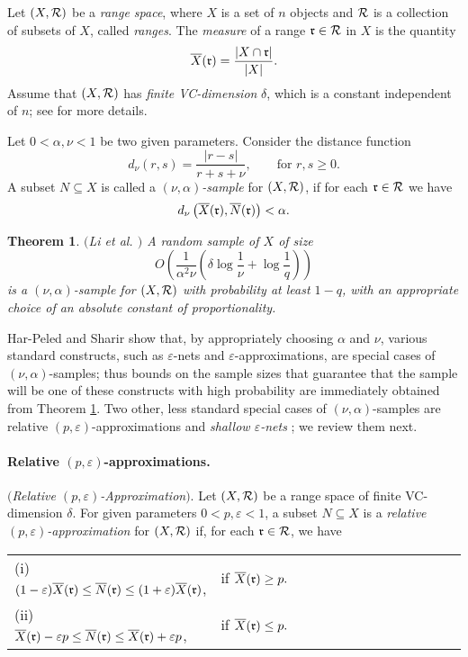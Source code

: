 \documentclass[11pt]{article}
\newtheorem{theorem}{Theorem}[section]
\def\peps{(p,\varepsilon)}
\def\eps{\varepsilon}
\def\R{\cal{R}}
\def\r{\frak{r}}
\def\meas#1#2{\overline{#1}(#2)}
\begin{document}
Let $(X,\R)$ be a \emph{range space}, where $X$ is a set of $n$ objects and $\R$ is a collection of subsets of $X$, called \emph{ranges}. The \emph{measure} of a range $\r \in \R$ in $X$ is the quantity
$$
\meas{X}{\r} = \frac{|X \cap \r|}{|X|}.
$$
Assume that $(X,\R)$ has {\em finite VC-dimension} $\delta$, which is a constant independent of $n$; see \cite{mat02} for more details.

Let $0< \alpha,\nu <1$ be two given parameters. Consider the distance function
$$
d_\nu(r,s) = \frac{|r-s|}{r+s+\nu}, \quad\quad \mbox{for $r,s \geq 0$} .
$$
A subset $N \subseteq X$ is called a {\em $(\nu, \alpha)$-sample} for $(X,\R)$, if for each $\r \in \R$ we have
$$
d_\nu\left(\meas{X}{\r}, \meas{N}{\r} \right) < \alpha .
$$

\begin{theorem} \label{thm_nu_alpha_sample} $(${\emph{Li et al.} \bf \cite{lls01}}$)$
A random sample of $X$ of size
$$
O\left(\frac{1}{\alpha^2\nu} \left(\delta \log\frac{1}{\nu} + \log\frac{1}{q} \right) \right)
$$
is a $(\nu,\alpha)$-sample for $(X,\R)$ with probability at least $1-q$, with an appropriate choice of an absolute constant of proportionality.
\end{theorem}

Har-Peled and Sharir \cite{hs11} show that, by appropriately choosing $\alpha$ and $\nu$, various standard constructs, such as $\eps$-nets and $\eps$-approximations, are special cases of $(\nu,\alpha)$-samples; thus bounds on the sample sizes that guarantee that the sample will be one of these constructs with high probability are immediately obtained from Theorem \ref{thm_nu_alpha_sample}. Two other, less standard special cases of $(\nu,\alpha)$-samples are relative $\peps$-approximations \cite{hs11} and {\em shallow $\eps$-nets} \cite{shsh11}; we review them next.

\paragraph{Relative $\peps$-approximations.}

\begin{defn} \label{definition_peps}
$(${\em Relative $\peps$-Approximation}$)$. Let $(X,\R)$ be a range space of finite VC-dimension $\delta$. For given parameters $0 < p,\eps < 1$, a subset $N \subseteq X$ is a \emph{relative $\peps$-approximation} for $(X,\R)$ if, for each $\r \in \R$, we have
\begin{center}
\begin{tabular}{lp{1\linewidth}}
(i) $(1-\eps) \meas{X}{\r} \leq \meas{N}{\r} \leq (1+\eps)\meas{X}{\r}$, \quad & if  $\meas{X}{\r} \geq p.$ \\[5pt]
(ii) $\meas{X}{\r} - \eps p \leq \meas{N}{\r} \leq \meas{X}{\r} + \eps p$,  \quad & if $\meas{X}{\r} \leq p.$
\end{tabular}
\end{center}
\end{defn}
\end{document}
